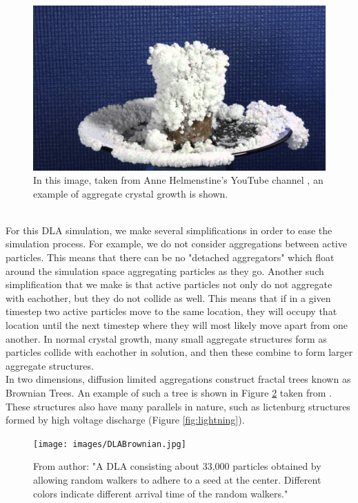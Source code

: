 \documentclass[fleqn,10pt]{UserGuideArx} %
\begin{document}
\begin{figure}[!h]\centering %
    \includegraphics[width=\linewidth]{images/saltCrystal.jpg}
    \caption{In this image, taken from Anne Helmenstine's YouTube channel \cite{Helmenstine:2011}, an example of aggregate crystal growth is shown.}
    \label{fig:AnneHelmenstineSalt}
    \end{figure}

~\\

For this DLA simulation, we make several simplifications in order to ease the simulation process. For example, we do not consider aggregations between active particles. This means that there can be no "detached aggregators" which float around the simulation space aggregating particles as they go. Another such simplification that we make is that active particles not only do not aggregate with eachother, but they do not collide as well. This means that if in a given timestep two active particles move to the same location, they will occupy that location until the next timestep where they will most likely move apart from one another. In normal crystal growth, many small aggregate structures form as particles collide with eachother in solution, and then these combine to form larger aggregate structures.\\

In two dimensions, diffusion limited aggregations construct fractal trees known as Brownian Trees. An example of such a tree is shown in Figure \ref{fig:brownianTree} taken from \cite{wikiBrown:2017}. These structures also have many parallels in nature, such as lictenburg structures formed by high voltage discharge (Figure \ref{fig:lightning}). 
\begin{figure}[!h]\centering %
    \texttt{[image: images/DLABrownian.jpg]}
    \caption{From author: "A DLA consisting about 33,000 particles obtained by allowing random walkers to adhere to a seed at the center. Different colors indicate different arrival time of the random walkers."\cite{wikiBrown:2017}}
    \label{fig:brownianTree}
\end{figure}
\end{document}

